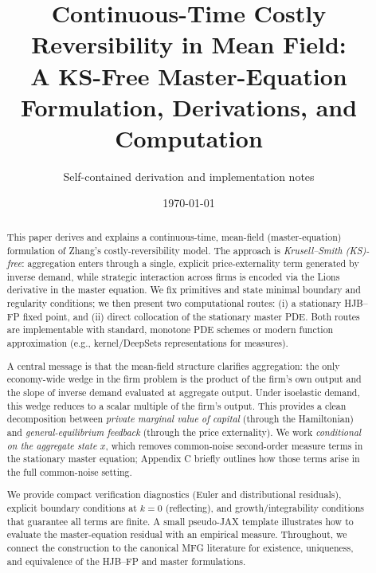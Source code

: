\documentclass[11pt,letterpaper,oneside]{article}
\title{\vspace{-1.5em}Continuous-Time Costly Reversibility in Mean Field:\\
A KS-Free Master-Equation Formulation, Derivations, and Computation}
\author{%
\small Self-contained derivation and implementation notes
}
\date{\small \today}
\numberwithin{equation}{section}
\newcommand{\ac}[1]{{\mdseries\textsc{#1}}}
\newcommand{\1}{\mathbf{1}}
\begin{document}
\maketitle

\begin{abstract}
\noindent
This paper derives and explains a continuous-time, mean-field (master-equation) formulation of Zhang's costly-reversibility model. The approach is \emph{Krusell--Smith (KS)-free}: aggregation enters through a single, explicit price-externality term generated by inverse demand, while strategic interaction across firms is encoded via the Lions derivative in the master equation. We fix primitives and state minimal boundary and regularity conditions; we then present two computational routes: (i) a stationary \ac{HJB}--\ac{FP} fixed point, and (ii) direct collocation of the stationary master \ac{PDE}. Both routes are implementable with standard, monotone PDE schemes or modern function approximation (e.g., kernel/DeepSets representations for measures).

A central message is that the mean-field structure clarifies aggregation: the only economy-wide wedge in the firm problem is the product of the firm's own output and the slope of inverse demand evaluated at aggregate output. Under isoelastic demand, this wedge reduces to a scalar multiple of the firm's output. This provides a clean decomposition between \emph{private marginal value of capital} (through the Hamiltonian) and \emph{general-equilibrium feedback} (through the price externality). We work \emph{conditional on the aggregate state $x$}, which removes common-noise second-order measure terms in the stationary master equation; Appendix C briefly outlines how those terms arise in the full common-noise setting.

We provide compact verification diagnostics (Euler and distributional residuals), explicit boundary conditions at $k=0$ (reflecting), and growth/integrability conditions that guarantee all terms are finite. A small pseudo-JAX template illustrates how to evaluate the master-equation residual with an empirical measure. Throughout, we connect the construction to the canonical \ac{MFG} literature for existence, uniqueness, and equivalence of the \ac{HJB}--\ac{FP} and master formulations.
\end{abstract}

\tableofcontents

\end{document}
